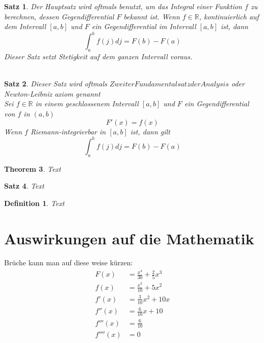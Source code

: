 \documentclass[fontsize=12pt,paper=a4,DIV12,cleardoublepage=empty, 
liststotoc,idxtotoc,bibtotoc]{article}
\newcommand{\RR}{\mathbb{R}}
\theoremstyle{plain}
\newtheorem{satz}{Satz}[subsection]
\newtheorem{theo}[satz]{Theorem}
\newtheorem{defi}{Definition}
\theoremstyle{definition}
\begin{document}
	\begin{satz}
		Der Hauptsatz wird oftmals benutzt, um das Integral einer Funktion $f$ zu berechnen, dessen Gegendifferential $F$ bekannt ist. Wenn $f \in \RR$, kontinuierlich auf dem Intervall $[a, b]$ und $F$ ein Gegendifferential im Intervall $[a, b]$ ist, dann
		\begin{equation}
			\int_{a}^{b}f(j)dj=F(b)-F(a)
		\end{equation}
		Dieser Satz setzt Stetigkeit auf dem ganzen Intervall voraus.\\\\
	\end{satz}
	
	\begin{satz}
	Dieser Satz wird oftmals $Zweiter Fundamentalsatz der Analysis$ oder Newton-Leibniz axiom genannt\\
	Sei $f \in \RR$ in einem geschlossenem Intervall $[a, b]$ und $F$ ein Gegendifferential von $f$ in $(a, b)$
	\begin{equation}
		F'(x)=f(x)
	\end{equation}
	Wenn $f$ Riemann-integrierbar in $[a, b]$ ist, dann gilt
	\begin{equation}
		\int_{a}^{b}f(j) dj = F(b)-F(a)
	\end{equation}
	\end{satz}
	
	\begin{theo}
		Text
	\end{theo}
	
	\begin{satz}
		Text
	\end{satz}
	
	\begin{defi}
		Text
	\end{defi}
	
	\section{Auswirkungen auf die Mathematik}
	Brüche kann man auf diese weise kürzen:
		\begin{equation}
			\begin{aligned}
				F(x)&=\frac{{x}^{4}}{30}+\frac{2}{5}{x}^{3}\\
				f(x)&=\frac{{x}^{3}}{10}+5{x}^{2}\\
				f'(x)&=\frac{3}{10}{x}^{2}+10x\\
				f''(x)&=\frac{6}{10}x+10\\
				f'''(x)&=\frac{6}{10}\\
				f''''(x)&=0\\
			\end{aligned}
		\end{equation}
\end{document}
